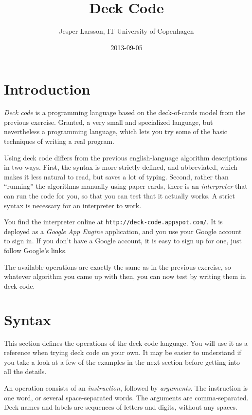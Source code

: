 \documentclass[a4paper,twoside]{tufte-handout}
\title{Deck Code}
\author{Jesper Larsson, IT University of Copenhagen}
\date{2013-09-05}
\begin{document}
\maketitle


\section{Introduction}\label{sec-intro}

\emph{Deck code} is a programming language based on the deck-of-cards
model from the previous exercise. Granted, a very small and
specialized language, but nevertheless a programming language, which
lets you try some of the basic techniques of writing a real program.

Using deck code differs from the previous english-language algorithm
descriptions in two ways. First, the syntax is more strictly defined,
and abbreviated, which makes it less natural to read, but saves a
lot of typing. Second, rather than ``running'' the algorithms manually
using paper cards, there is an \emph{interpreter} that can run the
code for you, so that you can test that it actually works. A strict
syntax is necessary for an interpreter to work.

You find the interpreter online at
\verb$http://deck-code.appspot.com/$. It is deployed as a \emph{Google
  App Engine} application, and you use your Google account to sign
in. If you don't have a Google account, it is easy to sign up for one,
just follow Google's links.

The available operations are exactly the same as in the previous
exercise, so whatever algorithm you came up with then, you can now
test by writing them in deck code.

\section{Syntax}\label{sec-syntax}

This section defines the operations of the deck code language. You
will use it as a reference when trying deck code on your own. It may
be easier to understand if you take a look at a few of the examples in
the next section before getting into all the details.

An operation consists of an \emph{instruction}, followed by
\emph{arguments}. The instruction is one word, or several
space-separated words. The arguments are comma-separated. Deck names
and labels are sequences of letters and digits, without any spaces.
\end{document}
